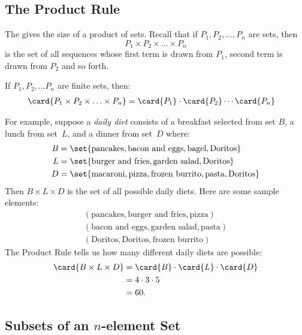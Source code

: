 \subsection{The Product Rule}

The  gives the size of a product of sets.  Recall
that if $P_1, P_2, \ldots, P_n$ are sets, then
%
\[
P_1 \times P_2 \times \ldots \times P_n
\]
%
is the set of all sequences whose first term is drawn from $P_1$,
second term is drawn from $P_2$ and so forth.

\begin{rul}
If $P_1, P_2, \ldots P_n$ are finite sets, then:
%
\begin{align*}
\card{P_1 \times P_2 \times \ldots \times P_n}
    & = \card{P_1} \cdot \card{P_2} \cdots \card{P_n}
\end{align*}
\end{rul}

For example, suppose a \emph{daily diet}
consists of a breakfast selected from set $B$, a lunch from set~$L$,
and a dinner from set~$D$ where:
%
\begin{align*}
B & = \set{\text{pancakes},
      	   \text{bacon and eggs},
           \text{bagel},
           \text{Doritos}} \\
L & = \set{\text{burger and fries},
           \text{garden salad},
           \text{Doritos}} \\
D & = \set{\text{macaroni},
           \text{pizza},
           \text{frozen burrito},
           \text{pasta},
           \text{Doritos}}
\end{align*}
%
Then $B \times L \times D$ is the set of all possible daily diets.
Here are some sample elements:
%
\begin{gather*}
(\text{pancakes}, \text{burger and fries}, \text{pizza}) \\
(\text{bacon and eggs}, \text{garden salad}, \text{pasta}) \\
(\text{Doritos}, \text{Doritos}, \text{frozen burrito})
\end{gather*}
%
The Product Rule tells us how many different daily diets are possible:
%
\begin{align*}
\card{B \times L \times D}
    & = \card{B} \cdot \card{L} \cdot \card{D} \\
    & = 4 \cdot 3 \cdot 5 \\
    & = 60.
\end{align*}

\subsection{Subsets of an $n$-element Set}\label{2nsubsets}
\iffalse

